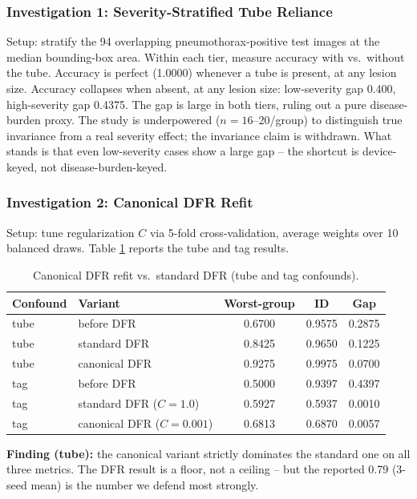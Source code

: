 \documentclass{ieeeaccess}
\begin{document}
\subsubsection{Investigation 1: Severity-Stratified Tube Reliance}
Setup: stratify the 94 overlapping pneumothorax-positive test images at the
median bounding-box area. Within each tier, measure accuracy with vs.\
without the tube. Accuracy is perfect (1.0000) whenever a tube is present, at
any lesion size. Accuracy collapses when absent, at any lesion size:
low-severity gap 0.400, high-severity gap 0.4375. The gap is large in both
tiers, ruling out a pure disease-burden proxy. The study is underpowered
($n=16$--20/group) to distinguish true invariance from a real severity
effect; the invariance claim is withdrawn. What stands is that even
low-severity cases show a large gap -- the shortcut is device-keyed, not
disease-burden-keyed.

\subsubsection{Investigation 2: Canonical DFR Refit}
\label{sec:phase5-6.4.2}
Setup: tune regularization $C$ via 5-fold cross-validation, average weights
over 10 balanced draws. Table \ref{tab:canonicaldfr} reports the tube and
tag results.

\begin{table}[h]
\caption{Canonical DFR refit vs.\ standard DFR (tube and tag confounds).}
\label{tab:canonicaldfr}
\centering
\footnotesize
\begin{tabular}{|l|p{62pt}|c|c|c|}
\hline
Confound & Variant & Worst-group & ID & Gap \\
\hline
tube & before DFR & 0.6700 & 0.9575 & 0.2875 \\
tube & standard DFR & 0.8425 & 0.9650 & 0.1225 \\
tube & canonical DFR & 0.9275 & 0.9975 & 0.0700 \\
tag & before DFR & 0.5000 & 0.9397 & 0.4397 \\
tag & standard DFR ($C{=}1.0$) & 0.5927 & 0.5937 & 0.0010 \\
tag & canonical DFR ($C{=}0.001$) & 0.6813 & 0.6870 & 0.0057 \\
\hline
\end{tabular}
\end{table}

\textbf{Finding (tube):} the canonical variant strictly dominates the
standard one on all three metrics. The DFR result is a floor, not a ceiling
-- but the reported 0.79 (3-seed mean) is the number we defend most
strongly.
\end{document}
